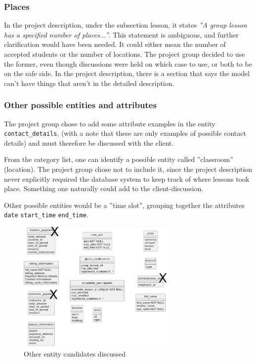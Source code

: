 \documentclass[a4paper]{scrartcl}
\begin{document}
\subsubsection*{Places}
In the project description, under the subsection lesson, it states  
\emph{''A group lesson has a specified number of places...''}. 
This statement is ambiguous,
and further clarification would have been needed. It could either mean the
number of accepted students or the number of locations. The project group
decided to use the former, even though discussions were held on which case to
use,  or both to be on the safe side.  In the project description, there is a
section that says the model can't have things that aren't in the detailed
description.

\subsubsection*{Other possible entities and attributes}
The project group chose to add some attribute examples in the entity 
\verb|contact_details|,
(with a note that these
are only examples of possible contact details) and 
must therefore be discussed 
with the client. 

From the category list, one can identify a possible entity
called ''classroom'' (location).
The project group chose not to include it, 
since the project description never explicitly required 
the database system to keep track of where lessons took place.
Something one naturally could add to the client-discussion. 

Other possible entities would be a ''time slot'', grouping 
together the attributes
\verb|date|
\verb|start_time|
\verb|end_time|.

\begin{figure}[h!]
  \begin{center}
    \includegraphics[width=0.7\textwidth]{figures/e_cand.png}
    \caption{Other entity candidates discussed}
    \label{fig:e_cand}
  \end{center}
\end{figure}
\end{document}
